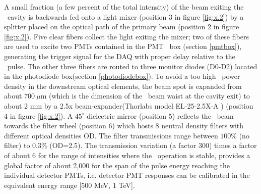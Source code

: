 A small fraction (a few percent of the total intensity) of the beam exiting the \laser~cavity is backwards fed onto a light mixer (position 3 in figure 
\ref{fig:x.2}) by a splitter placed on the optical path of the primary beam
(position 2 in figure \ref{fig:x.2}). Five clear fibers collect the light exiting
the mixer; two of these fibers are used to excite two PMTs contained in the PMT
~box (section \ref{pmtbox}), generating the trigger signal for the DAQ with proper delay
relative to the \laser~pulse. The other three fibers are routed to three monitor
diodes (D0-D2) located in the photodiode box(section \ref{photodiodebox}).  To avoid a too high \laser~power density in the downstream optical elements, the beam spot is expanded from
about $700 ~\mu$m
(which is the dimension of the \laser~beam waist at the cavity exit) to about 2 mm by
a 2.5x beam-expander(Thorlabs model EL-25-2.5X-A \cite{ref:thorlab}) (position 4 in figure
\ref{fig:x.2}). A $45^{\circ}$ dielectric mirror (position 5) reflects the \laser~beam towards the filter wheel (position 6) which hosts 8 neutral density filters
with different optical densities OD. The filter transmissions range between $100\%$
(no filter) to $0.3\%$ (OD=2.5). The transmission variation (a factor 300) times a
factor of about 6 for the range of intensities where the \laser~operation is stable,
provides a global factor of about 2,000 for the span of the pulse energy reaching
the individual detector PMTs, i.e. detector PMT responses can be calibrated in the
equivalent energy range [500 MeV, 1 TeV].

